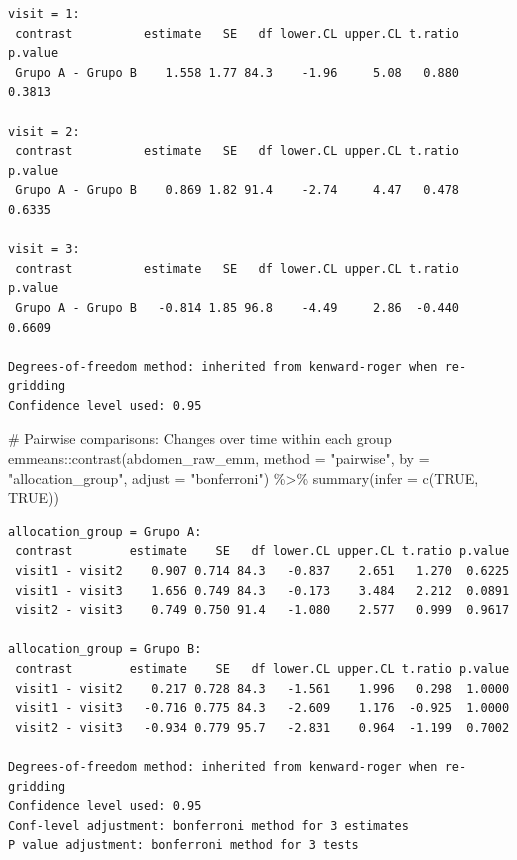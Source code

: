 \documentclass[
  letterpaper,
  DIV=11,
  numbers=noendperiod]{scrartcl}
\newenvironment{Shaded}{\begin{snugshade}}{\end{snugshade}}
\newcommand{\AttributeTok}[1]{\textcolor[rgb]{0.40,0.45,0.13}{#1}}
\newcommand{\CommentTok}[1]{\textcolor[rgb]{0.37,0.37,0.37}{#1}}
\newcommand{\ConstantTok}[1]{\textcolor[rgb]{0.56,0.35,0.01}{#1}}
\newcommand{\FunctionTok}[1]{\textcolor[rgb]{0.28,0.35,0.67}{#1}}
\newcommand{\NormalTok}[1]{\textcolor[rgb]{0.00,0.23,0.31}{#1}}
\newcommand{\SpecialCharTok}[1]{\textcolor[rgb]{0.37,0.37,0.37}{#1}}
\newcommand{\StringTok}[1]{\textcolor[rgb]{0.13,0.47,0.30}{#1}}
\begin{document}
\begin{verbatim}
visit = 1:
 contrast          estimate   SE   df lower.CL upper.CL t.ratio p.value
 Grupo A - Grupo B    1.558 1.77 84.3    -1.96     5.08   0.880  0.3813

visit = 2:
 contrast          estimate   SE   df lower.CL upper.CL t.ratio p.value
 Grupo A - Grupo B    0.869 1.82 91.4    -2.74     4.47   0.478  0.6335

visit = 3:
 contrast          estimate   SE   df lower.CL upper.CL t.ratio p.value
 Grupo A - Grupo B   -0.814 1.85 96.8    -4.49     2.86  -0.440  0.6609

Degrees-of-freedom method: inherited from kenward-roger when re-gridding 
Confidence level used: 0.95 
\end{verbatim}

\begin{Shaded}
\begin{Highlighting}[]
\CommentTok{\# Pairwise comparisons: Changes over time within each group}
\NormalTok{emmeans}\SpecialCharTok{::}\FunctionTok{contrast}\NormalTok{(abdomen\_raw\_emm, }\AttributeTok{method =} \StringTok{"pairwise"}\NormalTok{, }\AttributeTok{by =} \StringTok{"allocation\_group"}\NormalTok{, }\AttributeTok{adjust =} \StringTok{"bonferroni"}\NormalTok{) }\SpecialCharTok{\%\textgreater{}\%} \FunctionTok{summary}\NormalTok{(}\AttributeTok{infer =} \FunctionTok{c}\NormalTok{(}\ConstantTok{TRUE}\NormalTok{, }\ConstantTok{TRUE}\NormalTok{))}
\end{Highlighting}
\end{Shaded}

\begin{verbatim}
allocation_group = Grupo A:
 contrast        estimate    SE   df lower.CL upper.CL t.ratio p.value
 visit1 - visit2    0.907 0.714 84.3   -0.837    2.651   1.270  0.6225
 visit1 - visit3    1.656 0.749 84.3   -0.173    3.484   2.212  0.0891
 visit2 - visit3    0.749 0.750 91.4   -1.080    2.577   0.999  0.9617

allocation_group = Grupo B:
 contrast        estimate    SE   df lower.CL upper.CL t.ratio p.value
 visit1 - visit2    0.217 0.728 84.3   -1.561    1.996   0.298  1.0000
 visit1 - visit3   -0.716 0.775 84.3   -2.609    1.176  -0.925  1.0000
 visit2 - visit3   -0.934 0.779 95.7   -2.831    0.964  -1.199  0.7002

Degrees-of-freedom method: inherited from kenward-roger when re-gridding 
Confidence level used: 0.95 
Conf-level adjustment: bonferroni method for 3 estimates 
P value adjustment: bonferroni method for 3 tests 
\end{verbatim}
\end{document}
